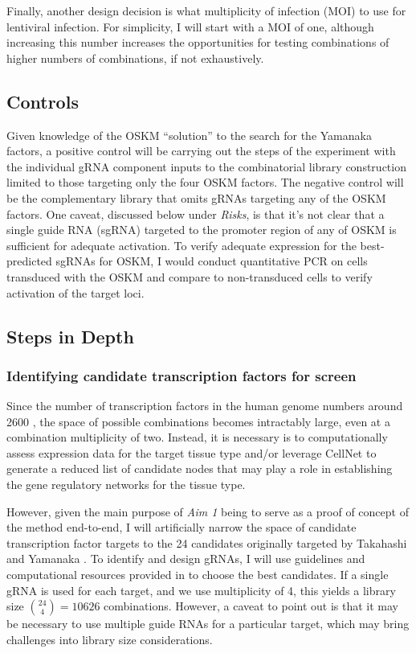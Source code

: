 \documentclass[10pt]{article}
\begin{document}
Finally, another design decision is what multiplicity of infection (MOI) to use for lentiviral infection. For simplicity, I will start with a MOI of one, although increasing this number increases the opportunities for testing combinations of higher numbers of combinations, if not exhaustively.

\subsection{Controls}

Given knowledge of the OSKM ``solution'' to the search for the Yamanaka factors, a positive control will be carrying out the steps of the experiment with the individual gRNA component inputs to the combinatorial library construction limited to those targeting only the four OSKM factors. The negative control will be the complementary library that omits gRNAs targeting any of the OSKM factors. One caveat, discussed below under \textit{Risks}, is that it's not clear that a single guide RNA (sgRNA) targeted to the promoter region of any of OSKM is sufficient for adequate activation. To verify adequate expression for the best-predicted sgRNAs for OSKM, I would conduct quantitative PCR on cells transduced with the OSKM and compare to non-transduced cells to verify activation of the target loci.

\subsection{Steps in Depth}

\subsubsection{Identifying candidate transcription factors for screen}

Since the number of transcription factors in the human genome numbers around 2600 \cite{babu2004structure}, the space of possible combinations becomes intractably large, even at a combination multiplicity of two. Instead, it is necessary is to computationally assess expression data for the target tissue type and/or leverage CellNet \cite{cahan2014cellnet} to generate a reduced list of candidate nodes that may play a role in establishing the gene regulatory networks for the tissue type.

However, given the main purpose of \textit{Aim 1} being to serve as a proof of concept of the method end-to-end, I will artificially narrow the space of candidate transcription factor targets to the 24 candidates originally targeted by Takahashi and Yamanaka \cite{takahashi2006induction}. To identify and design gRNAs, I will use guidelines and computational resources provided in \cite{konermann2014genome} to choose the best candidates. If a single gRNA is used for each target, and we use multiplicity of 4, this yields a library size $\binom{24}{4}=10626$ combinations. However, a caveat to point out is that it may be necessary to use multiple guide RNAs for a particular target, which may bring challenges into library size considerations.
\end{document}
